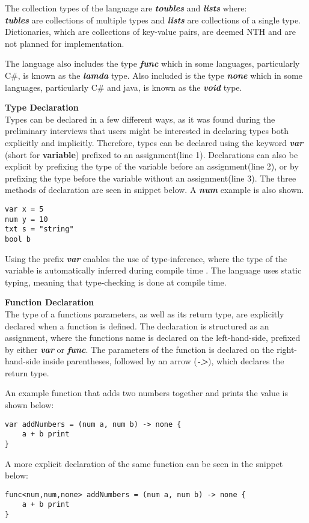 The collection types of the language are \textbf{\textit{toubles}} and \textbf{\textit{lists}} where:\\
\textbf{\textit{tubles}} are collections of multiple types and \textbf{\textit{lists}} are collections of a single type.
Dictionaries, which are collections of key-value pairs, are deemed NTH and are not planned for implementation. 

The language also includes the type \textbf{\textit{func}} which in some languages, particularly C\#, is known as the \textbf{\textit{lamda}} type.
Also included is the type \textbf{\textit{none}} which in some languages, particularly C\# and java, is known as the \textbf{\textit{void}} type. 

\textbf{Type Declaration}\\
Types can be declared in a few different ways, as it was found during the preliminary interviews that users might be interested in declaring types both explicitly and implicitly.
Therefore, types can be declared using the keyword \textbf{\textit{var}} (short for \textbf{variable\textit{}}) prefixed to an assignment(line 1).
Declarations can also be explicit by prefixing the type of the variable before an assignment(line 2), or by prefixing the type before the variable without an assignment(line 3).
The three methods of declaration are seen in snippet below.
A  \textbf{\textit{num}} example is also shown.
\begin{lstlisting}
var x = 5
num y = 10
txt s = "string"
bool b
\end{lstlisting}

Using the prefix \textbf{\textit{var}} enables the use of type-inference, where the type of the variable is automatically inferred during compile time \cite{typeinf}.
The language uses static typing, meaning that type-checking is done at compile time.

\textbf{Function Declaration}\\
The type of a functions parameters, as well as its return type, are explicitly declared when a function is defined. 
The declaration is structured as an assignment, where the functions name is declared on the left-hand-side, prefixed by either \textbf{\textit{var}} or \textbf{\textit{func}}. 
The parameters of the function is declared on the right-hand-side inside parentheses, followed by an arrow (\textbf{\textit{->}}), which declares the return type. 

An example function that adds two numbers together and prints the value is shown below:
\begin{lstlisting}
var addNumbers = (num a, num b) -> none {
	a + b print
}
\end{lstlisting} 
A more explicit declaration of the same function can be seen in the snippet below:
\begin{lstlisting}
func<num,num,none> addNumbers = (num a, num b) -> none {
	a + b print
}
\end{lstlisting}

